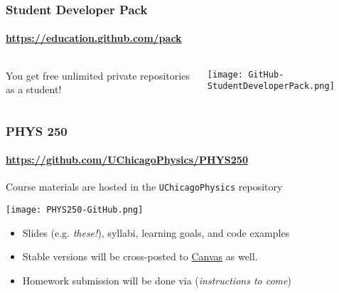 \documentclass[hyperref={colorlinks=true}]{beamer}
\begin{document}

\begin{frame}%
  \frametitle{\github Student Developer Pack}
  \framesubtitle{\url{https://education.github.com/pack}}
  
  \begin{columns}
  
    
      You get free unlimited private repositories as a student! 
    
    
      \texttt{[image: GitHub-StudentDeveloperPack.png]}
  
  \end{columns}

\end{frame}


\begin{frame}%
  \frametitle{PHYS 250 \github}
  \framesubtitle{\url{https://github.com/UChicagoPhysics/PHYS250}}
  
  Course materials are hosted in the \github \texttt{UChicagoPhysics} repository
  
  \begin{center}
    \texttt{[image: PHYS250-GitHub.png]}
  \end{center}

  \vspace{-0.5cm}

  \begin{itemize}
    \item Slides (e.g. \textit{these!}), syllabi, learning goals, and code examples
    \item Stable versions will be cross-posted to \href{\CanvasURL}{Canvas} as well.
    \item Homework submission will be done via \github (\textit{instructions to come})
  \end{itemize}
  
  
\end{frame}

\end{document}
